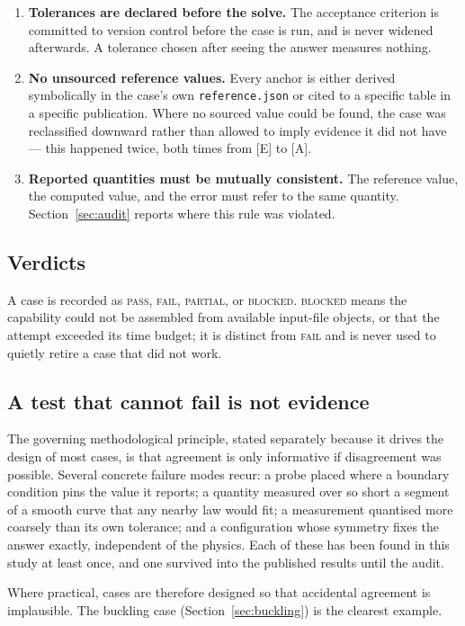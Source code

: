 \documentclass[11pt,a4paper]{article}
\begin{document}
\begin{enumerate}
\item \textbf{Tolerances are declared before the solve.} The acceptance criterion
  is committed to version control before the case is run, and is never widened
  afterwards. A tolerance chosen after seeing the answer measures nothing.
\item \textbf{No unsourced reference values.} Every anchor is either derived
  symbolically in the case's own \texttt{reference.json} or cited to a specific
  table in a specific publication. Where no sourced value could be found, the
  case was reclassified downward rather than allowed to imply evidence it did not
  have --- this happened twice, both times from [E] to [A].
\item \textbf{Reported quantities must be mutually consistent.} The reference
  value, the computed value, and the error must refer to the same quantity.
  Section~\ref{sec:audit} reports where this rule was violated.
\end{enumerate}

\subsection{Verdicts}
A case is recorded as \textsc{pass}, \textsc{fail}, \textsc{partial}, or
\textsc{blocked}. \textsc{blocked} means the capability could not be assembled
from available input-file objects, or that the attempt exceeded its time budget;
it is distinct from \textsc{fail} and is never used to quietly retire a case that
did not work.

\subsection{A test that cannot fail is not evidence}
The governing methodological principle, stated separately because it drives the
design of most cases, is that agreement is only informative if disagreement was
possible. Several concrete failure modes recur: a probe placed where a boundary
condition pins the value it reports; a quantity measured over so short a segment
of a smooth curve that any nearby law would fit; a measurement quantised more
coarsely than its own tolerance; and a configuration whose symmetry fixes the
answer exactly, independent of the physics. Each of these has been found in this
study at least once, and one survived into the published results until the audit.

Where practical, cases are therefore designed so that accidental agreement is
implausible. The buckling case (Section~\ref{sec:buckling}) is the clearest
example.
\end{document}
